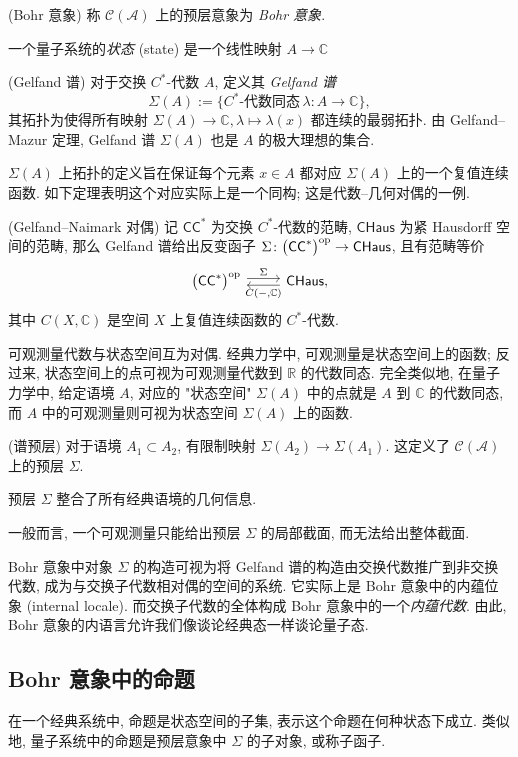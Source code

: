 \begin{definition}
    {(Bohr 意象)}
    称 $\mathcal C(\mathcal A)$ 上的预层意象为 \emph{Bohr 意象}.
\end{definition}

一个量子系统的\emph{状态} (state) 是一个线性映射 $A \to \mathbb{C}$

\begin{definition}
    {(Gelfand 谱)}
    对于交换 $C^*$-代数 $A$, 定义其 \emph{Gelfand 谱}
$$
\Sigma(A) := \{C^*\text{-代数同态}\,\lambda\colon A \to\mathbb{C}\},
$$
其拓扑为使得所有映射 $\Sigma(A)\to\mathbb{C}, \lambda \mapsto \lambda (x)$ 都连续的最弱拓扑. 由 Gelfand--Mazur 定理, Gelfand 谱 $\Sigma(A)$ 也是 $A$ 的极大理想的集合.
\end{definition}

$\Sigma(A)$ 上拓扑的定义旨在保证每个元素 $x\in A$ 都对应 $\Sigma(A)$ 上的一个复值连续函数. 如下定理表明这个对应实际上是一个同构; 这是代数--几何对偶的一例.

\begin{prop}
    {(Gelfand--Naimark 对偶)}
    记 $\mathsf {CC}^*$ 为交换 $C^*$-代数的范畴, $\mathsf{CHaus}$ 为紧 Hausdorff 空间的范畴,
    那么 Gelfand 谱给出反变函子 $\Sigma\colon \big(\mathsf {CC}^*\big)^{\text{op}} \to \mathsf {CHaus}$, 且有范畴等价
    \[\begin{tikzcd}[ampersand replacement=\&]
    	{\big(\mathsf {CC}^*\big)^{\op}} \& {\mathsf {CHaus},}
    	\arrow["\Sigma", shift left, from=1-1, to=1-2]
    	\arrow["{C({-},\mathbb{C})}", shift left, from=1-2, to=1-1]
    \end{tikzcd}\]
    其中 $C(X,\mathbb{C})$ 是空间 $X$ 上复值连续函数的 $C^*$-代数.
\end{prop}

可观测量代数与状态空间互为对偶. 经典力学中, 可观测量是状态空间上的函数; 反过来, 状态空间上的点可视为可观测量代数到 $\mathbb{R}$ 的代数同态.
完全类似地, 在量子力学中, 给定语境 $A$, 对应的 "状态空间" $\Sigma(A)$ 中的点就是 $A$ 到 $\mathbb{C}$ 的代数同态, 而 $A$ 中的可观测量则可视为状态空间 $\Sigma(A)$ 上的函数.

\begin{definition}
    {(谱预层)}
    对于语境 $A_1 \subset A_2$, 有限制映射 $\Sigma(A_2)\to\Sigma(A_1)$. 这定义了 $\mathcal C(\mathcal A)$ 上的预层 $\Sigma$.
\end{definition}

\begin{remark}
    {}
    预层 $\Sigma$ 整合了所有经典语境的几何信息.
    
    一般而言, 一个可观测量只能给出预层 $\Sigma$ 的局部截面, 而无法给出整体截面.
\end{remark}

Bohr 意象中对象 $\Sigma$ 的构造可视为将 Gelfand 谱的构造由交换代数推广到非交换代数, 成为与交换子代数相对偶的空间的系统. 它实际上是 Bohr 意象中的内蕴位象 (internal locale). 而交换子代数的全体构成 Bohr 意象中的一个\emph{内蕴代数}. 由此, Bohr 意象的内语言允许我们像谈论经典态一样谈论量子态.

\subsection{Bohr 意象中的命题}



在一个经典系统中, 命题是状态空间的子集, 表示这个命题在何种状态下成立.
类似地, 量子系统中的命题是预层意象中 $\Sigma$ 的子对象, 或称子函子.